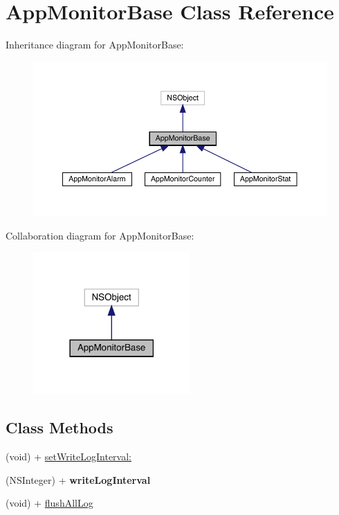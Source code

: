 \hypertarget{interface_app_monitor_base}{}\section{App\+Monitor\+Base Class Reference}
\label{interface_app_monitor_base}


Inheritance diagram for App\+Monitor\+Base\+:\nopagebreak
\begin{figure}[H]
\begin{center}
\leavevmode
\includegraphics[width=350pt]{interface_app_monitor_base__inherit__graph}
\end{center}
\end{figure}


Collaboration diagram for App\+Monitor\+Base\+:\nopagebreak
\begin{figure}[H]
\begin{center}
\leavevmode
\includegraphics[width=170pt]{interface_app_monitor_base__coll__graph}
\end{center}
\end{figure}
\subsection*{Class Methods}
\begin{DoxyCompactItemize}
\item 
(void) + \mbox{\hyperlink{interface_app_monitor_base_abecd4ef5619d223b35720cfb52920e67}{set\+Write\+Log\+Interval\+:}}
\item 
\mbox{\label{interface_app_monitor_base_acb7ad29f3a86a0ea4bb120ec8f5de481}} 
(N\+S\+Integer) + {\bfseries write\+Log\+Interval}
\item 
(void) + \mbox{\hyperlink{interface_app_monitor_base_adcba6f18de71fd598f4fa88fd7c76e2b}{flush\+All\+Log}}
\end{DoxyCompactItemize}


